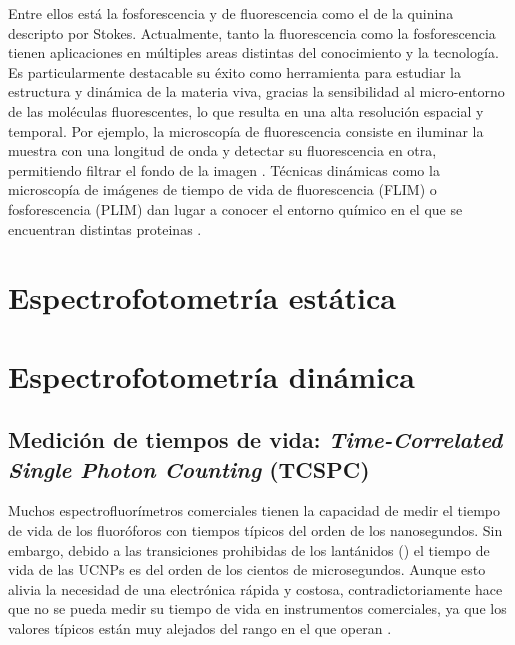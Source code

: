 Entre ellos está la fosforescencia  y de fluorescencia como el de la quinina descripto por Stokes.
Actualmente, tanto la fluorescencia como la fosforescencia tienen aplicaciones en múltiples areas distintas del conocimiento y la tecnología. 
Es particularmente destacable su éxito como herramienta para estudiar la estructura y dinámica de la materia viva, gracias la sensibilidad al micro-entorno de las moléculas fluorescentes, lo que resulta en una alta resolución espacial y temporal. 
Por ejemplo, la microscopía de fluorescencia consiste en iluminar la muestra con una longitud de onda y detectar su fluorescencia en otra, permitiendo filtrar el fondo de la imagen \cite{VALEUR}.
Técnicas dinámicas como la microscopía de imágenes de tiempo de vida de fluorescencia (FLIM) o fosforescencia (PLIM) dan lugar a conocer el entorno químico en el que se encuentran distintas proteinas \todo{[CITA]}.




\section{Espectrofotometría estática}
\section{Espectrofotometría dinámica} \label{sec:intro_tcspc}

\subsection{Medición de tiempos de vida: \textit{Time-Correlated Single Photon Counting} (TCSPC) }

Muchos espectrofluorímetros comerciales tienen la capacidad de medir el tiempo de vida de los fluoróforos con tiempos típicos del orden de los nanosegundos. 
Sin embargo, debido a las transiciones prohibidas de los lantánidos () el tiempo de vida de las UCNPs es del orden de los cientos de microsegundos.
Aunque esto alivia la necesidad de una electrónica rápida y costosa, contradictoriamente hace que no se pueda medir su tiempo de vida en instrumentos comerciales, ya que los valores típicos están muy alejados del rango en el que operan \cite{bujjamer2020}.

